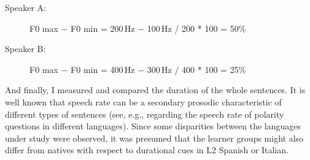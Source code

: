 \begin{description}
\item [Speaker A:]   F0 max $-$ F0 min = 200\,Hz $-$ 100\,Hz / 200 * 100 = 50\%
\item [Speaker B:]   F0 max $-$ F0 min = 400\,Hz $-$ 300\,Hz / 400 * 100 = 25\%
\end{description}


And finally, I measured and compared the duration of the whole sentences. It is well known that speech rate can be a secondary prosodic characteristic of different types of sentences (see, e.g., \citealt{vanHeuvenvanZanten2005} regarding the speech rate of polarity questions in different languages). Since some disparities between the languages under study were observed, it was presumed that the learner groups might also differ from natives with respect to durational cues in L2 Spanish or Italian.
